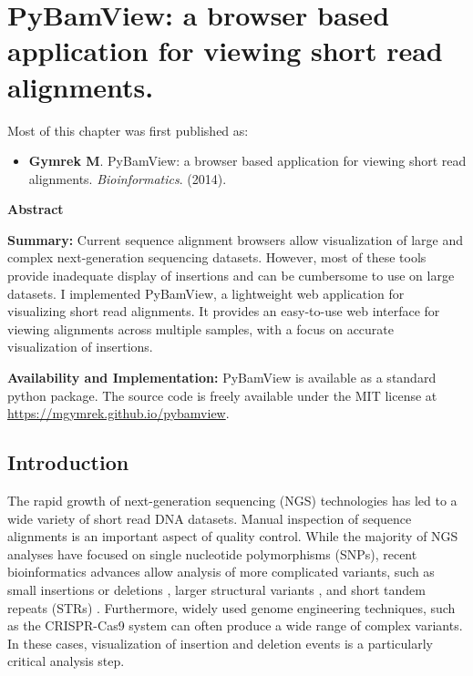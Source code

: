\chapter{PyBamView: a browser based application for viewing short read alignments.}
\label{chap:pbv}
\hzline

Most of this chapter was first published as:

\begin{itemize}
\item[] \textbf{Gymrek M}. PyBamView: a browser based application for viewing short read alignments. \emph{Bioinformatics}. (2014).
\end{itemize}

\hzline

\textbf{Abstract}

\textbf{Summary:} Current sequence alignment browsers allow visualization of large and complex next-generation sequencing datasets. However, most of these tools provide inadequate display of insertions and can be cumbersome to use on large datasets. I implemented PyBamView, a lightweight web application for visualizing short read alignments. It provides an easy-to-use web interface for viewing alignments across multiple samples, with a focus on accurate visualization of insertions.

\textbf{Availability and Implementation:} PyBamView is available as a standard python package. The source code is freely available under the MIT license at \url{https://mgymrek.github.io/pybamview}. 

\section{Introduction}

The rapid growth of next-generation sequencing (NGS) technologies has led to a wide variety of short read DNA datasets. Manual inspection of sequence alignments is an important aspect of quality control. While the majority of NGS analyses have focused on single nucleotide polymorphisms (SNPs), recent bioinformatics advances allow analysis of more complicated variants, such as small insertions or deletions \cite{MontgomeryGoodeKvikstadEtAl2013}, larger structural variants \cite{YeSchulzLongEtAl2009}, and short tandem repeats (STRs) \cite{HighnamFranckMartinEtAl2013,GymrekGolanRossetEtAl2012}. Furthermore, widely used genome engineering techniques, such as the CRISPR-Cas9 system \cite{CongRanCoxEtAl2013} can often produce a wide range of complex variants. In these cases, visualization of insertion and deletion events is a particularly critical analysis step.

